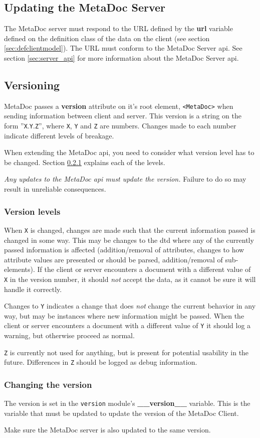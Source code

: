 \subsection{Updating the MetaDoc Server}
The MetaDoc server must respond to the URL defined by the \textbf{url} variable
defined on the definition class of the data on the client (see section
\ref{sec:defclientmodel}). The URL must conform to the MetaDoc Server
\gls{api}. See section \ref{sec:server_api} for more information about the
MetaDoc Server \gls{api}.

\subsection{Versioning}
\label{sec:version}
MetaDoc passes a \textbf{version} attribute on it's root element,
\texttt{<MetaDoc>} when sending information between client and server. This
version is a string on the form ''\texttt{X}.\texttt{Y}.\texttt{Z}'', where
\texttt{X}, \texttt{Y} and \texttt{Z} are numbers. Changes made to each number 
indicate different levels of breakage. 

When extending the MetaDoc \gls{api}, you need to consider what version level
has to be changed. Section \ref{sec:version_levels} explains each of the
levels.

\textit{Any updates to the MetaDoc \gls{api} must update the version.} Failure
to do so may result in unreliable consequences.

\subsubsection{Version levels}
\label{sec:version_levels}
When \texttt{X} is changed, changes are made such that the current information
passed is changed in some way. This may be changes to the \gls{dtd} where any
of the currently passed information is affected (addition/removal of
attributes, changes to how attribute values are presented or should be parsed,
addition/removal of sub-elements). If the client or server encounters a
document with a different value of \texttt{X} in the version number, it should
\textit{not} accept the data, as it cannot be sure it will handle it correctly.

Changes to \texttt{Y} indicates a change that does \textit{not} change the
current behavior in any way, but may be instances where new information might
be passed. When the client or server encounters a document with a different
value of \texttt{Y} it should log a warning, but otherwise proceed as normal.

\texttt{Z} is currently not used for anything, but is present for potential
usability in the future. Differences in \texttt{Z} should be logged as debug
information.

\subsubsection{Changing the version}
The version is set in the \texttt{version} module's \textbf{\_\_version\_\_}
variable. This is the variable that must be updated to update the version of
the MetaDoc Client.

Make sure the MetaDoc server is also updated to the same version.
